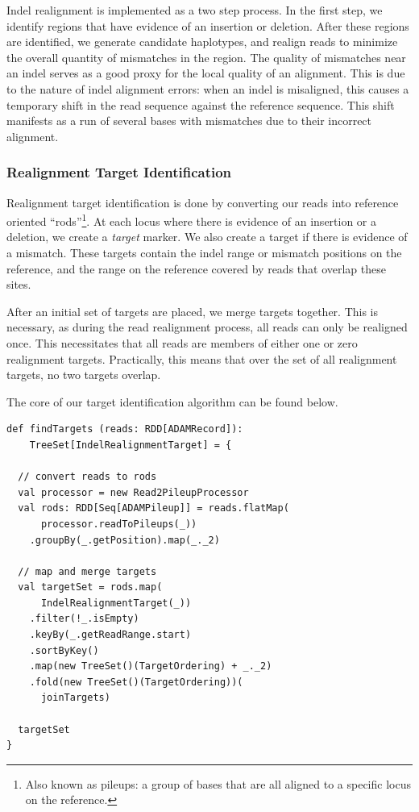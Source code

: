 \documentclass[10pt,twocolumn]{article}
\theoremstyle{plain}
\begin{document}
Indel realignment is implemented as a two step process. In the first step, we identify regions that have evidence of an insertion or
deletion. After these regions are identified, we generate candidate haplotypes, and realign reads to minimize the overall quantity
of mismatches in the region. The quality of mismatches near an indel serves as a good proxy for the local quality of an alignment.
This is due to the nature of indel alignment errors: when an indel is misaligned, this causes a temporary shift in the read sequence
against the reference sequence. This shift manifests as a run of several bases with mismatches due to their incorrect alignment.

\subsubsection{Realignment Target Identification}
\label{sec:realignment-target-identification}

Realignment target identification is done by converting our reads into reference oriented ``rods''\footnote{Also known as pileups: a
group of bases that are all aligned to a specific locus on the reference.}. At each locus where there is evidence of an insertion or a
deletion, we create a \emph{target} marker. We also create a target if there is evidence of a mismatch. These targets contain the indel
range or mismatch positions on the reference, and the range on the reference covered by reads that overlap these sites.

After an initial set of targets are placed, we merge targets together. This is necessary, as during the read realignment process, all
reads can only be realigned once. This necessitates that all reads are members of either one or zero realignment targets. Practically,
this means that over the set of all realignment targets, no two targets overlap.

The core of our target identification algorithm can be found below.

\begin{lstlisting}
def findTargets (reads: RDD[ADAMRecord]):
    TreeSet[IndelRealignmentTarget] = {

  // convert reads to rods
  val processor = new Read2PileupProcessor
  val rods: RDD[Seq[ADAMPileup]] = reads.flatMap(
      processor.readToPileups(_))
    .groupBy(_.getPosition).map(_._2)

  // map and merge targets
  val targetSet = rods.map(
      IndelRealignmentTarget(_))
    .filter(!_.isEmpty)
    .keyBy(_.getReadRange.start)
    .sortByKey()
    .map(new TreeSet()(TargetOrdering) + _._2)
    .fold(new TreeSet()(TargetOrdering))(
      joinTargets)

  targetSet
}
\end{lstlisting}
\end{document}
